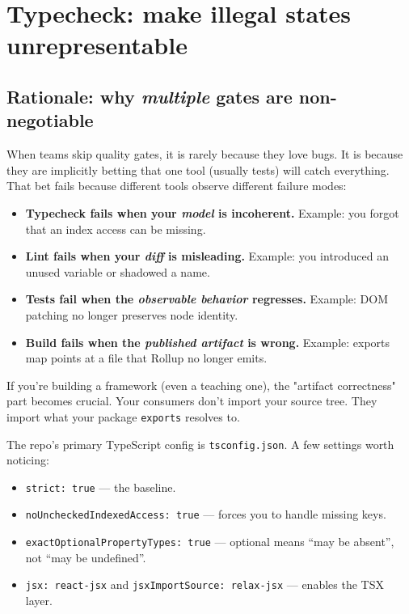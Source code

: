 \section{Typecheck: make illegal states unrepresentable}

\subsection{Rationale: why \emph{multiple} gates are non-negotiable}

When teams skip quality gates, it is rarely because they love bugs.
It is because they are implicitly betting that one tool (usually tests) will catch everything.
That bet fails because different tools observe different failure modes:

\begin{itemize}
\item \textbf{Typecheck fails when your \emph{model} is incoherent.} Example: you forgot that an index access can be missing.
\item \textbf{Lint fails when your \emph{diff} is misleading.} Example: you introduced an unused variable or shadowed a name.
\item \textbf{Tests fail when the \emph{observable behavior} regresses.} Example: DOM patching no longer preserves node identity.
\item \textbf{Build fails when the \emph{published artifact} is wrong.} Example: exports map points at a file that Rollup no longer emits.
\end{itemize}

If you're building a framework (even a teaching one), the "artifact correctness" part becomes crucial.
Your consumers don't import your source tree.
They import what your package \texttt{exports} resolves to.

The repo's primary TypeScript config is \texttt{tsconfig.json}.
A few settings worth noticing:

\begin{itemize}
\item \texttt{strict: true} --- the baseline.
\item \texttt{noUncheckedIndexedAccess: true} --- forces you to handle missing keys.
\item \texttt{exactOptionalPropertyTypes: true} --- optional means ``may be absent'', not ``may be undefined''.
\item \texttt{jsx: react-jsx} and \texttt{jsxImportSource: relax-jsx} --- enables the TSX layer.
\end{itemize}

